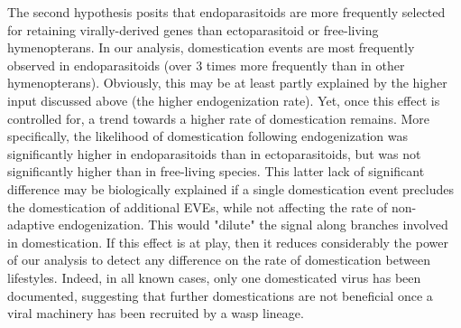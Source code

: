 The second hypothesis posits that endoparasitoids are more frequently selected for retaining  virally-derived genes than ectoparasitoid or free-living hymenopterans. In our analysis, domestication events are most frequently observed in endoparasitoids (over 3 times more frequently than in other hymenopterans). Obviously, this may be at least partly explained by the higher input discussed above (the higher endogenization rate). Yet, once this effect is controlled for, a trend towards a higher rate of domestication remains. More specifically, the likelihood of domestication following endogenization was significantly higher in endoparasitoids than in ectoparasitoids, but was not significantly higher than in free-living species. This latter lack of signiﬁcant difference may be biologically explained if a single domestication event precludes the domestication of additional EVEs, while not affecting the rate of non-adaptive endogenization. This would "dilute" the signal along branches involved in domestication. If this effect is at play, then it reduces considerably the power of our analysis to detect any difference on the rate of domestication between lifestyles. Indeed, in all known cases, only one domesticated virus has been documented, suggesting that further domestications are not beneficial once a viral machinery has been recruited by a wasp lineage.

